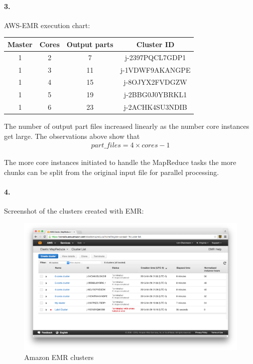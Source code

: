 \documentclass[a4paper]{article}
\begin{document}
\paragraph{3. } AWS-EMR execution chart: \\
\begin{center}
  \begin{tabular}{ |c|c|c|c| }
    \hline
    Master & Cores & Output parts & Cluster ID \\ \hline
    1 & 2 & 7 & j{-}2397PQCL7GDP1 \\ \hline
    1 & 3 & 11 & j{-}1VDWF9AKANGPE \\ \hline
    1 & 4 & 15 & j{-}8OJYX2FVDGZW \\ \hline
    1 & 5 & 19 & j{-}2BBG0J0YBRKL1 \\ \hline
    1 & 6 & 23 & j{-}2ACHK4SU3NDIB \\ \hline
  \end{tabular}
\end{center}

The number of output part files increased linearly as the number core instances get large. The observations above show that
\begin{align}
  part\_files = 4 \times cores - 1
\end{align}

The more core instances initiated to handle the MapReduce tasks the more chunks can be split from the original input file for parallel processing. \\
 
\paragraph{4. } Screenshot of the clusters created with EMR:
\begin{figure}[H]
  \centering
    \includegraphics[scale=.37]{emr_clusters.png}
  \caption{Amazon EMR clusters}
\end{figure}
\end{document}
